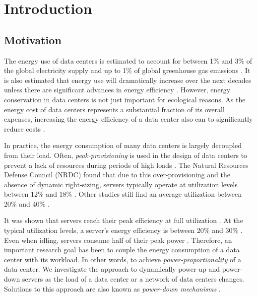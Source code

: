 
\chapter{Introduction}\label{chapter:introduction}

\section{Motivation}

The energy use of data centers is estimated to account for between 1\% and 3\% of the global electricity supply and up to 1\% of global greenhouse gas emissions \cite{Shehabi2016, Jones2018, Bashroush2020, Masanet2020}. It is also estimated that energy use will dramatically increase over the next decades unless there are significant advances in energy efficiency \cite{Jones2018}. However, energy conservation in data centers is not just important for ecological reasons. As the energy cost of data centers represents a substantial fraction of its overall expenses, increasing the energy efficiency of a data center also can to significantly reduce costs \cite{Barroso2007, Brill2007, Hamilton2008}.

In practice, the energy consumption of many data centers is largely decoupled from their load. Often, \emph{peak-provisioning} is used in the design of data centers to prevent a lack of resources during periods of high loads \cite{Whitney2014}. The Natural Resources Defense Council (NRDC) found that due to this over-provisioning and the absence of dynamic right-sizing, servers typically operate at utilization levels between 12\% and 18\% \cite{Whitney2014}. Other studies still find an average utilization between 20\% and 40\% \cite{Barroso2007, Armbrust2010}.

It was shown that servers reach their peak efficiency at full utilization \cite{Barroso2007}. At the typical utilization levels, a server's energy efficiency is between 20\% and 30\% \cite{Barroso2007}. Even when idling, servers consume half of their peak power \cite{Barroso2007}. Therefore, an important research goal has been to couple the energy consumption of a data center with its workload. In other words, to achieve \emph{power-proportionality} of a data center. We investigate the approach to dynamically power-up and power-down servers as the load of a data center or a network of data centers changes. Solutions to this approach are also known as \emph{power-down mechanisms} \cite{Jin2016}.


